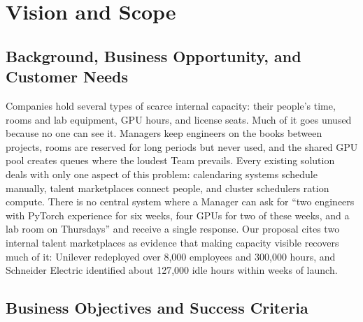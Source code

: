 \section{Vision and Scope}\label{sec:vision}

\subsection{Background, Business Opportunity, and Customer Needs}

Companies hold several types of scarce internal capacity: their people's time, rooms and lab equipment, GPU hours, and license seats. Much of it goes unused because no one can see it. Managers keep engineers on the books between projects, rooms are reserved for long periods but never used, and the shared GPU pool creates queues where the loudest Team prevails. Every existing solution deals with only one aspect of this problem: calendaring systems schedule manually, talent marketplaces connect people, and cluster schedulers ration compute. There is no central system where a Manager can ask for ``two engineers with PyTorch experience for six weeks, four GPUs for two of these weeks, and a lab room on Thursdays'' and receive a single response. Our proposal cites two internal talent marketplaces as evidence that making capacity visible recovers much of it: Unilever redeployed over 8{,}000 employees and 300{,}000 hours, and Schneider Electric identified about 127{,}000 idle hours within weeks of launch.

\subsection{Business Objectives and Success Criteria}


